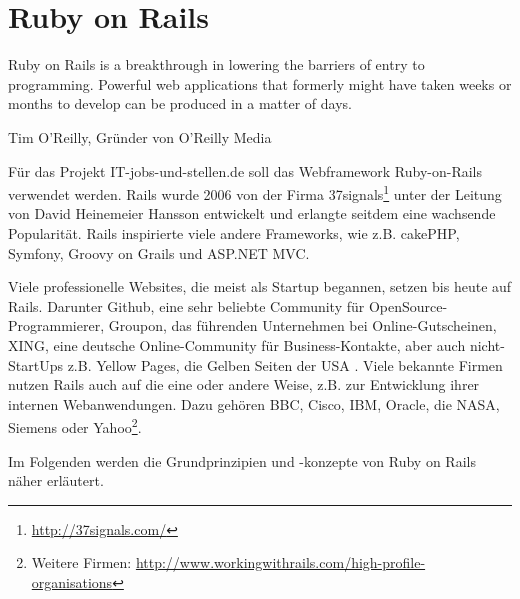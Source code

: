 \newpage

\section{Ruby on Rails}
\label{sec:rails}
\epigraph{Ruby on Rails is a breakthrough in lowering the barriers of entry to programming. Powerful web applications that formerly might have taken weeks or months to develop can be produced in a matter of days.}{Tim O'Reilly, Gründer von O'Reilly Media}


Für das Projekt IT-jobs-und-stellen.de soll das Webframework Ruby-on-Rails verwendet werden. Rails wurde 2006 von der Firma 37signals\footnote{\url{http://37signals.com/}} unter der Leitung von David Heinemeier Hansson entwickelt und erlangte seitdem eine wachsende Popularität. Rails inspirierte viele andere Frameworks, wie z.B. cakePHP, Symfony, Groovy on Grails und ASP.NET MVC.

Viele professionelle Websites, die meist als Startup begannen, setzen bis heute auf Rails. Darunter Github, eine sehr beliebte Community für OpenSource-Programmierer,  Groupon, das führenden Unternehmen bei Online-Gutscheinen, XING, eine deutsche Online-Community für Business-Kontakte, aber auch nicht-StartUps z.B. Yellow Pages, die Gelben Seiten der USA \citep{ruby_on_rails_2011}. Viele bekannte Firmen nutzen Rails auch auf die eine oder andere Weise, z.B. zur Entwicklung ihrer internen Webanwendungen. Dazu gehören BBC, Cisco, IBM, Oracle, die NASA, Siemens oder Yahoo\footnote{Weitere Firmen: \url{http://www.workingwithrails.com/high-profile-organisations}}.

Im Folgenden werden die Grundprinzipien und -konzepte von Ruby on Rails näher erläutert.

